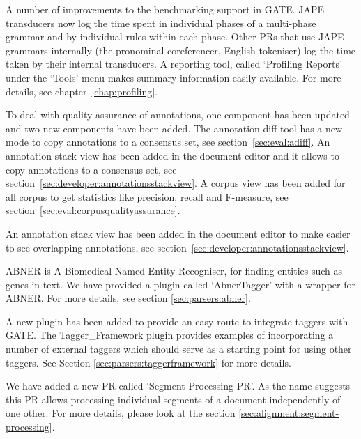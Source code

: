
A number of improvements to the benchmarking support in GATE. JAPE transducers
now log the time spent in individual phases of a multi-phase grammar and by
individual rules within each phase. Other PRs that use JAPE grammars
internally (the pronominal coreferencer, English tokeniser) log the time taken
by their internal transducers. A reporting tool, called `Profiling Reports' 
under the `Tools' menu makes summary information easily available. For more
details, see chapter~\ref{chap:profiling}.


To deal with quality assurance of annotations, one component has been
updated and two new components have been added. The annotation diff tool has
a new mode to copy annotations to a consensus set, see
section~\ref{sec:eval:adiff}. An annotation stack view has been added in the
document editor and it allows to copy annotations to a consensus set, see
section~\ref{sec:developer:annotationsstackview}. A corpus view has been
added for all corpus to get statistics like precision, recall and F-measure,
see section~\ref{sec:eval:corpusqualityassurance}.

An annotation stack view has been added in the document editor to make
easier to see overlapping annotations, see
section~\ref{sec:developer:annotationsstackview}.


ABNER is A Biomedical Named Entity Recogniser, for finding entities such as
genes in text. We have provided a plugin called `AbnerTagger' with a wrapper
for ABNER. For more details, see section \ref{sec:parsers:abner}.


A new plugin has been added to provide an easy route to integrate taggers with
GATE. The Tagger\_Framework plugin provides examples of incorporating a number
of external taggers which should serve as a starting point for using other
taggers. See Section \ref{sec:parsers:taggerframework} for more details.



We have added a new PR called `Segment Processing PR'. As the name suggests
this PR allows processing individual segments of a document independently of one
other. For more details, please look at the section 
\ref{sec:alignment:segment-processing}.



